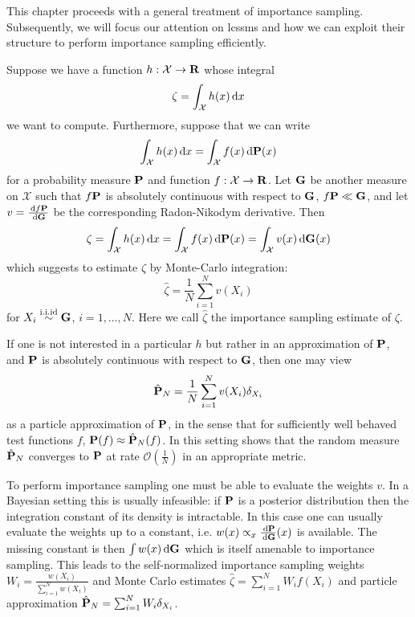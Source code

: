 This chapter proceeds with a general treatment of importance sampling. Subsequently, we will focus our attention on \glspl{lcssm} and how we can exploit their structure to perform importance sampling efficiently. 

Suppose we have a function $h: \mathcal X \to \R$ whose integral $$\zeta = \int_{\mathcal X} h(x) \d x$$ we want to compute.
Furthermore, suppose that we can write
$$
    \int_{\mathcal X} h(x) \d x = \int_{\mathcal X} f(x) \d \P(x)
$$
for a probability measure $\P$ and function $f: \mathcal X \to \R$.
Let $\G$ be another measure on $\mathcal X$ such that $f\P$ is absolutely continuous with respect to $\G$, $f\P \ll \G$, and let $v = \frac{\d f\P}{\d\G}$ be the corresponding Radon-Nikodym derivative. Then
$$
    \zeta = \int_{\mathcal X} h(x) \d x = \int_{\mathcal X} f(x) \d \P(x) = \int_{\mathcal X} v(x)\d\G(x)
$$
which suggests to estimate $\zeta$ by Monte-Carlo integration: $$\hat \zeta = \frac 1 N \sum_{i=1}^{N} v(X_i)$$ for $X_i \iid \G$, $i = 1, \dots, N$. Here we call $\hat \zeta$ the importance sampling estimate of $\zeta$.

If one is not interested in a particular $h$ but rather in an approximation of $\P$, and $\P$ is absolutely continuous with respect to $\G$, then one may view $$\hat \P_N = \frac{1}{N} \sum_{i = 1}^{N} v(X_i) \delta_{X_i}$$ as a particle approximation of $\P$, in the sense that for sufficiently well behaved test functions $f$, $\P (f) \approx \hat\P_{N}(f)$. In this setting \cite{Agapiou2017Importance} shows that the random measure $\hat \P_N$ converges to $\P$ at rate $\mathcal O\left(\frac 1 N\right)$ in an appropriate metric.

To perform importance sampling one must be able to evaluate the weights $v$. In a Bayesian setting this is usually infeasible: if $\P$ is a posterior distribution then the integration constant of its density is intractable.
In this case one can usually evaluate the weights up to a constant, i.e. $w(x) \propto_x \frac{\d \P}{\d \G}(x)$ is available. The missing constant is then $\int w(x) \d \G$ which is itself amenable to importance sampling.
This leads to the self-normalized importance sampling weights $W_i = \frac{w(X_i)}{\sum_{i = 1}^N w(X_i)}$ and Monte Carlo estimates $\hat \zeta = \sum_{i = 1}^{N} W_i f(X_i)$ and particle approximation $\hat \P_N = \sum_{i = 1}^{N} W_i \delta_{X_i}$.

